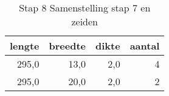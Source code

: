 \begin{table}[h!]
\centering
\caption{Stap 8 Samenstelling stap 7 en zeiden}
\begin{tabular}{rrrr}
\toprule
 lengte &  breedte &  dikte &  aantal \\
\midrule
  295,0 &     13,0 &    2,0 &       4 \\
  295,0 &     20,0 &    2,0 &       2 \\
\bottomrule
\end{tabular}
\end{table}
